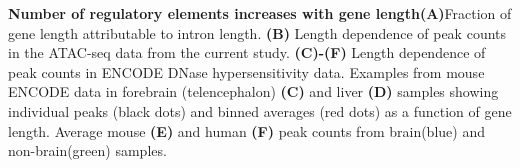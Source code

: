 \textbf{Number of regulatory elements increases with gene length}\textbf{(A)}Fraction of gene length attributable to intron
length. \textbf{(B)} Length dependence of peak counts in the ATAC-seq data from the current study. \textbf{(C)-(F)} Length dependence of peak counts in ENCODE DNase hypersensitivity data. Examples from mouse ENCODE data in forebrain (telencephalon) \textbf{(C)} and liver \textbf{(D)} samples showing individual peaks (black dots) and binned averages (red dots) as a function of gene length. Average mouse \textbf{(E)} and human \textbf{(F)} peak counts from brain(blue) and non-brain(green) samples.

